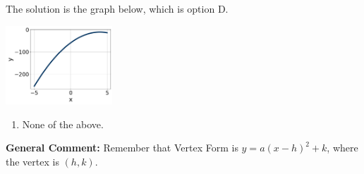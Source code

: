 \documentclass{extbook}[14pt]
\begin{document}
\begin{enumerate}
{The solution is the graph below, which is option D.
\begin{center}
    \includegraphics[width=0.3\textwidth]{../Figures/quadraticEquationToGraphDA.png}
\end{center}\begin{enumerate}[label=\Alph*.]
\item None of the above.\end{enumerate}
\textbf{General Comment:} Remember that Vertex Form is $y = a(x-h)^2+k$, where the vertex is $(h, k)$.
}
\end{enumerate}
\end{document}
